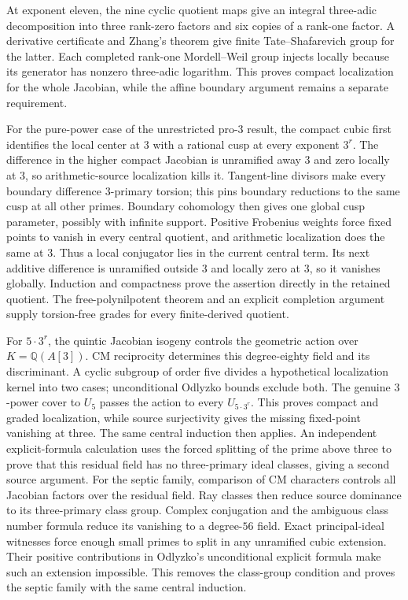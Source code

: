 \documentclass[11pt]{article}
\newcommand{\Q}{\mathbb Q}
\numberwithin{equation}{section}
\theoremstyle{definition}
\begin{document}
At exponent eleven, the nine cyclic quotient maps give an integral
three-adic decomposition into three rank-zero factors and six copies
of a rank-one factor. A derivative certificate and Zhang's theorem
give finite Tate--Shafarevich group for the latter. Each completed
rank-one Mordell--Weil group injects locally because its generator
has nonzero three-adic logarithm. This proves compact localization
for the whole Jacobian, while the affine boundary argument remains
a separate requirement.

For the pure-power case of the unrestricted pro-$3$ result, the compact
 cubic first identifies the local center at $3$ with a rational cusp
 at every exponent $3^r$.
 The difference in the higher compact Jacobian is unramified away $3$
 and zero locally at $3$, so arithmetic-source localization kills it.
 Tangent-line divisors make every boundary difference $3$-primary torsion;
 this pins boundary reductions to the same cusp at all other primes.
 Boundary cohomology then gives one global cusp parameter, possibly
 with infinite support. Positive Frobenius weights force fixed points
 to vanish in every central quotient, and arithmetic localization does
 the same at $3$. Thus a local conjugator lies in the current central
 term. Its next additive difference is unramified outside $3$ and locally
 zero at $3$, so it vanishes globally. Induction and compactness prove
 the assertion directly in the retained quotient. The free-polynilpotent
 theorem and an explicit completion argument supply torsion-free grades
 for every finite-derived quotient.

For $5\cdot3^r$, the quintic Jacobian isogeny controls the geometric
action over $K=\Q(A[3])$. CM reciprocity determines this degree-eighty
field and its discriminant. A cyclic subgroup of order five divides
a hypothetical localization kernel into two cases; unconditional
Odlyzko bounds exclude both. The genuine $3$-power cover to $U_5$
passes the action to every $U_{5\cdot3^r}$. This proves compact and
graded localization, while source surjectivity gives the missing
fixed-point vanishing at three. The same central induction then applies.
An independent explicit-formula calculation uses the forced splitting
of the prime above three to prove that this residual field has no
three-primary ideal classes, giving a second source argument.
For the septic family, comparison of CM characters controls all
Jacobian factors over the residual field. Ray classes then reduce
source dominance to its three-primary class group. Complex conjugation
and the ambiguous class number formula reduce its vanishing to a
degree-$56$ field. Exact principal-ideal witnesses force enough small
primes to split in any unramified cubic extension. Their positive
contributions in Odlyzko's unconditional explicit formula make such
an extension impossible. This removes the class-group condition and
proves the septic family with the same central induction.
\end{document}
